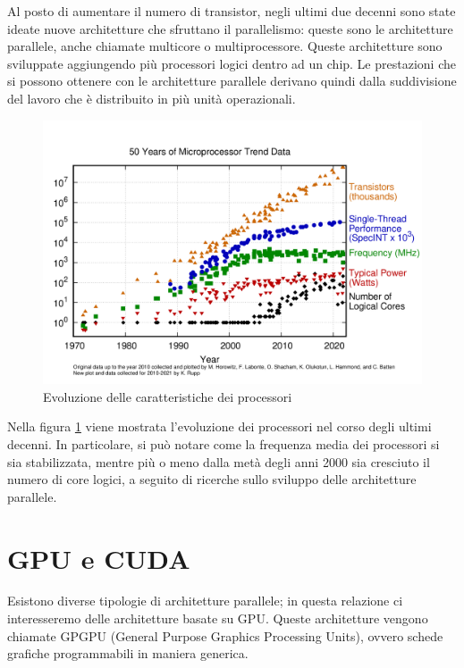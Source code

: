 \documentclass[12pt,a4paper,openright,twoside]{report}
\begin{document}
Al posto di aumentare il numero di transistor, negli ultimi due decenni sono state ideate nuove architetture che sfruttano il parallelismo: queste sono le architetture parallele, anche chiamate multicore o multiprocessore. Queste architetture sono sviluppate aggiungendo più processori logici dentro ad un chip. Le prestazioni che si possono ottenere con le architetture parallele derivano quindi dalla suddivisione del lavoro che è distribuito in più unità operazionali.

\begin{figure}[h]
\centering{}
\includegraphics[width=\textwidth]{50-years-processor-trend.png}
\caption{Evoluzione delle caratteristiche dei processori}
\label{img:trend_proc}
\end{figure}

Nella figura \ref{img:trend_proc} viene mostrata l'evoluzione dei processori nel corso degli ultimi decenni. In particolare, si può notare come la frequenza media dei processori si sia stabilizzata, mentre più o meno dalla metà degli anni 2000 sia cresciuto il numero di core logici, a seguito di ricerche sullo sviluppo delle architetture parallele.

\section{GPU e CUDA}

Esistono diverse tipologie di architetture parallele; in questa relazione ci interesseremo delle architetture basate su GPU. Queste architetture vengono chiamate GPGPU (General Purpose Graphics Processing Units), ovvero schede grafiche programmabili in maniera generica.
\end{document}
